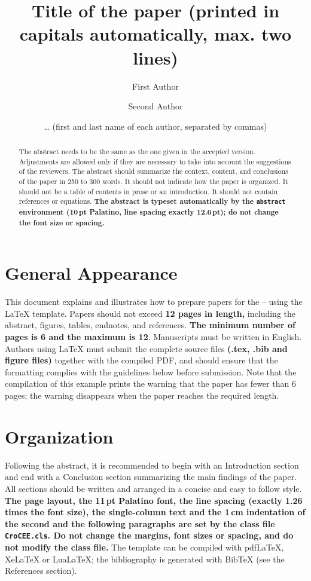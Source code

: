 \documentclass{Definitions/CroCEE}
\title{Title of the paper (printed in capitals automatically, max. two lines)}
\author[1]{First Author}
\author[2]{Second Author}
\author{… (first and last name of each author, separated by commas)}
\affiliation[1]{Position, affiliation, e-mail address}
\affiliation[2]{Position, affiliation, e-mail address}
\begin{document}
\maketitle

\begin{abstract}
The abstract needs to be the same as the one given in the accepted version. Adjustments are allowed only if they are necessary to take into account the suggestions of the reviewers. The abstract should summarize the context, content, and conclusions of the paper in 250 to 300 words. It should not indicate how the paper is organized. It should not be a table of contents in prose or an introduction. It should not contain references or equations. \textbf{The abstract is typeset automatically by the \texttt{abstract} environment (10\,pt Palatino, line spacing exactly 12.6\,pt); do not change the font size or spacing.}
\end{abstract}


\section{General Appearance}

This document explains and illustrates how to prepare papers for the \ConfFullName{} -- \ConfShort{} \ConfYear{} using the LaTeX template. Papers should not exceed \textbf{12 pages in length,} including the abstract, figures, tables, endnotes, and references. \textbf{The minimum number of pages is 6 and the maximum is 12}. Manuscripts must be written in English. Authors using LaTeX must submit the complete source files \textbf{(.tex, .bib and figure files)} together with the compiled PDF, and should ensure that the formatting complies with the guidelines below before submission. Note that the compilation of this example prints the warning that the paper has fewer than 6 pages; the warning disappears when the paper reaches the required length.

\section{Organization}

Following the abstract, it is recommended to begin with an Introduction section and end with a Conclusion section summarizing the main findings of the paper. All sections should be written and arranged in a concise and easy to follow style. \textbf{The page layout, the 11\,pt Palatino font, the line spacing (exactly 1.26 times the font size), the single-column text and the 1\,cm indentation of the second and the following paragraphs are set by the class file \texttt{CroCEE.cls}. Do not change the margins, font sizes or spacing, and do not modify the class file.} The template can be compiled with pdfLaTeX, XeLaTeX or LuaLaTeX; the bibliography is generated with BibTeX (see the References section).
\end{document}
